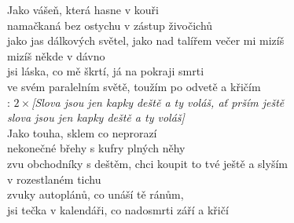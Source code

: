 

Jako vášeň, která hasne v kouři\\
namačkaná bez ostychu v zástup živočichů\\
jako jas dálkových světel, jako nad talířem večer mi mizíš\\
mizíš někde v dávno\\
jsi láska, co mě škrtí, já na pokraji smrti\\
ve svém paralelním světě, toužím po odvetě a křičím\\

\textregistered: $2\times$\emph{[Slova jsou jen kapky deště a ty voláš, ať prším ještě\\
slova jsou jen kapky deště a ty voláš]}\\

Jako touha, sklem co neprorazí\\
nekonečné břehy s kufry plných něhy\\
zvu obchodníky s deštěm, chci koupit to tvé ještě a slyším\\
v rozestlaném tichu\\
zvuky autoplánů, co unáší tě ránům,\\
jsi tečka v kalendáři, co nadosmrti září a křičí\\

\textregistered

\newpage
